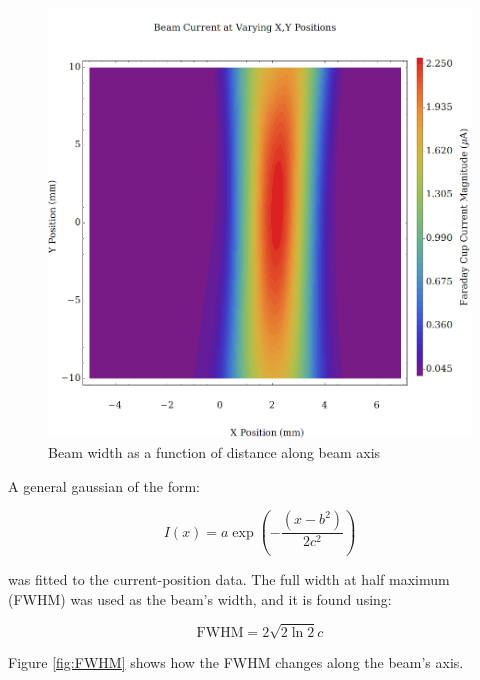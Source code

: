 \begin{figure}[h!]
    \centering
    \includegraphics[width=0.85\linewidth]{../Beam Divergence/Plots/BeamwidthContour.png}
	\caption{Beam width as a function of distance along beam axis}
    \label{fig:long}
\end{figure}

A general gaussian of the form:

\begin{equation}
	I(x) = a \exp{\left(-\frac{(x-b^2)}{2c^2}\right)}
\end{equation}

was fitted to the current-position data. The full width at half maximum (FWHM) was used as the beam's width, and it is found using:

\begin{equation}
	\mathrm{FWHM} = 2\sqrt{2\ln2}c
\end{equation}

Figure \ref{fig:FWHM} shows how the FWHM changes along the beam's axis. 

